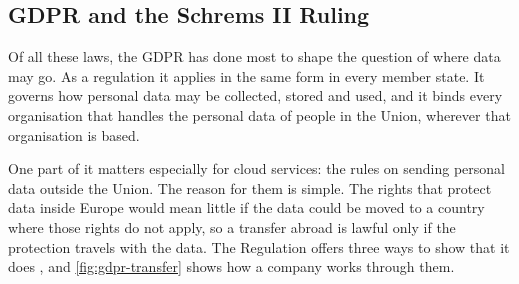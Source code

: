 \subsection{GDPR and the Schrems II Ruling}
\label{subsec:gdpr-schrems}

Of all these laws, the \ac{GDPR} \cite{GDPR2016} has done most to shape the
question of where data may go. As a regulation it applies in the same form in
every member state. It governs how personal data may be collected, stored and
used, and it binds every organisation that handles the personal data of people in
the Union, wherever that organisation is based.

One part of it matters especially for cloud services: the rules on sending
personal data outside the Union. The reason for them is simple. The rights that
protect data inside Europe would mean little if the data could be moved to a
country where those rights do not apply, so a transfer abroad is lawful only if
the protection travels with the data. The Regulation offers three ways to show that
it does \cite{GDPR2016}, and \cref{fig:gdpr-transfer} shows how a company works
through them.

